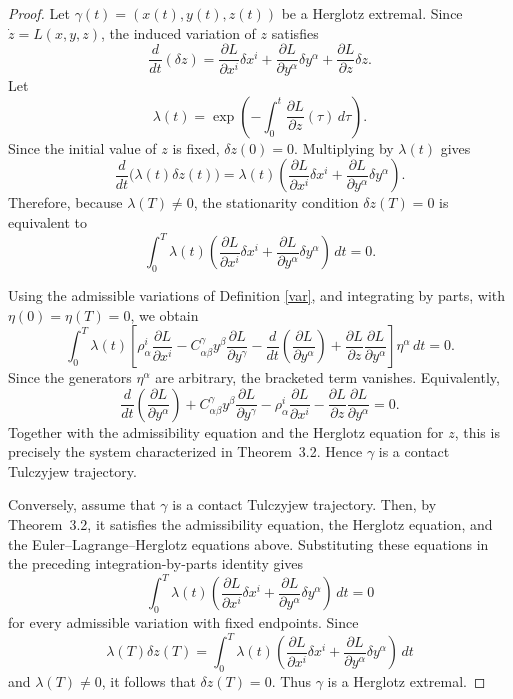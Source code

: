 \documentclass[11pt]{article}
\begin{document}
\begin{proof}
Let \(\gamma(t)=(x(t),y(t),z(t))\) be a Herglotz extremal. Since
\(\dot z=L(x,y,z)\), the induced variation of \(z\) satisfies
\[
\frac{d}{dt}(\delta z)
=
\frac{\partial L}{\partial x^i}\delta x^i
+
\frac{\partial L}{\partial y^\alpha}\delta y^\alpha
+
\frac{\partial L}{\partial z}\delta z .
\]
Let
\[
\lambda(t)=
\exp\left(
-\int_0^t
\frac{\partial L}{\partial z}(\tau)\,d\tau
\right).
\]
Since the initial value of \(z\) is fixed, \(\delta z(0)=0\). Multiplying by
\(\lambda(t)\) gives
\[
\frac{d}{dt}\bigl(\lambda(t)\delta z(t)\bigr)
=
\lambda(t)
\left(
\frac{\partial L}{\partial x^i}\delta x^i
+
\frac{\partial L}{\partial y^\alpha}\delta y^\alpha
\right).
\]
Therefore, because \(\lambda(T)\neq 0\), the stationarity condition
\(\delta z(T)=0\) is equivalent to
\[
\int_0^T
\lambda(t)
\left(
\frac{\partial L}{\partial x^i}\delta x^i
+
\frac{\partial L}{\partial y^\alpha}\delta y^\alpha
\right)\,dt=0.
\]

Using the admissible variations of Definition \ref{var}, and integrating by parts, with \(\eta(0)=\eta(T)=0\), we obtain
\[
\int_0^T
\lambda(t)
\left[
\rho^i_\alpha\frac{\partial L}{\partial x^i}
-
C^\gamma_{\alpha\beta}y^\beta
\frac{\partial L}{\partial y^\gamma}
-
\frac{d}{dt}
\left(
\frac{\partial L}{\partial y^\alpha}
\right)
+
\frac{\partial L}{\partial z}
\frac{\partial L}{\partial y^\alpha}
\right]
\eta^\alpha\,dt=0 .
\]
Since the generators \(\eta^\alpha\) are arbitrary, the bracketed term vanishes.
Equivalently,
\[
\frac{d}{dt}
\left(
\frac{\partial L}{\partial y^\alpha}
\right)
+
C^\gamma_{\alpha\beta}y^\beta
\frac{\partial L}{\partial y^\gamma}
-
\rho^i_\alpha
\frac{\partial L}{\partial x^i}
-
\frac{\partial L}{\partial z}
\frac{\partial L}{\partial y^\alpha}
=0 .
\]
Together with the admissibility equation and the Herglotz equation for \(z\), this
is precisely the system characterized in Theorem~3.2. Hence \(\gamma\) is a
contact Tulczyjew trajectory.

Conversely, assume that \(\gamma\) is a contact Tulczyjew trajectory. Then, by
Theorem~3.2, it satisfies the admissibility equation, the Herglotz equation, and
the Euler--Lagrange--Herglotz equations above. Substituting these equations in the
preceding integration-by-parts identity gives
\[
\int_0^T
\lambda(t)
\left(
\frac{\partial L}{\partial x^i}\delta x^i
+
\frac{\partial L}{\partial y^\alpha}\delta y^\alpha
\right)\,dt=0
\]
for every admissible variation with fixed endpoints. Since
\[
\lambda(T)\delta z(T)
=
\int_0^T
\lambda(t)
\left(
\frac{\partial L}{\partial x^i}\delta x^i
+
\frac{\partial L}{\partial y^\alpha}\delta y^\alpha
\right)\,dt
\]
and \(\lambda(T)\neq 0\), it follows that \(\delta z(T)=0\). Thus \(\gamma\) is a
Herglotz extremal.
\end{proof}
\end{document}
